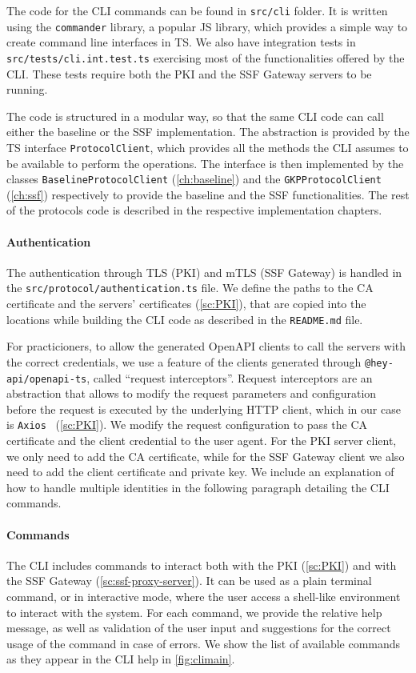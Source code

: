 The code for the CLI commands can be found in \texttt{src/cli} folder.
It is written using the \texttt{commander} library, a popular
JS library, which provides a simple way to 
create command line interfaces in TS.
We also have integration tests in \texttt{src/tests/cli.int.test.ts}
exercising most of the functionalities offered by the CLI.
These tests require both the PKI and the SSF Gateway servers to be running.

The code is structured in a modular way, so that the same CLI
code can call either the baseline or the SSF implementation.
The abstraction is provided by the TS interface \texttt{ProtocolClient},
which provides all the methods the CLI assumes to be available
to perform the operations. The interface is then
implemented by the classes \texttt{BaselineProtocolClient} (\cref{ch:baseline})
and the \texttt{GKPProtocolClient} (\cref{ch:ssf})
respectively to provide the baseline and the SSF functionalities.
The rest of the protocols code is described in the respective
implementation chapters.

\paragraph{Authentication}
The authentication through TLS (PKI) and mTLS (SSF Gateway)
is handled in the \texttt{src/protocol/authentication.ts} file.
We define the paths to the CA certificate and 
the servers' certificates (\cref{sc:PKI}), that are copied
into the locations while building the CLI code
as described in the \texttt{README.md} file.

For practicioners, to allow the generated OpenAPI clients to call
the servers with the correct credentials,
we use a feature of the clients generated through \texttt{@hey-api/openapi-ts}, called ``request interceptors''.
Request interceptors are an abstraction that allows
to modify the request parameters and configuration
before the request is executed by the underlying HTTP client,
which in our case is \texttt{Axios}~\cite{OpenAPIAxios} (\cref{sc:PKI}).
We modify the request configuration to pass the
CA certificate and the client credential
to the user agent. For the PKI server client,
we only need to add the CA certificate,
while for the SSF Gateway client we also need to
add the client certificate and private key.
We include an explanation of how to handle multiple
identities in the following paragraph detailing the CLI commands.

\paragraph{Commands}
The CLI includes commands to interact both with the PKI (\cref{sc:PKI}) 
and with the SSF Gateway (\cref{sc:ssf-proxy-server}).
It can be used as a plain terminal command, or
in interactive mode, where the user access
a shell-like environment to interact with the system.
For each command, we provide the relative help message,
as well as validation of the user input and 
suggestions for the correct usage of the command
in case of errors.
We show the list of available commands as they appear
in the CLI help in \cref{fig:climain}. 

